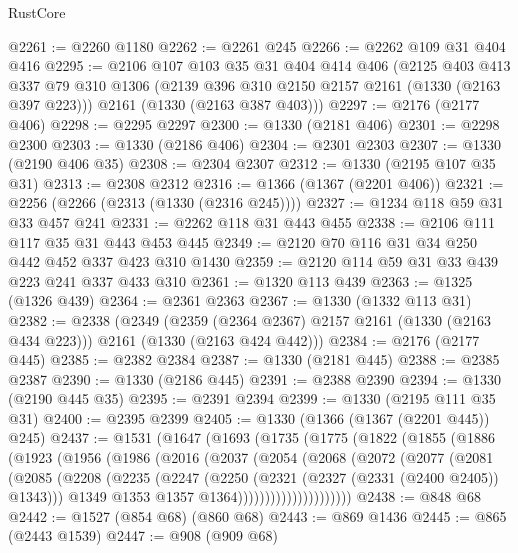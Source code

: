 \begin{lexlean}{RustCore}
\begin{coremodule}
{\begin{coremodule}
{{{{{{{{@2261 := @2260 @1180
@2262 := @2261 @245
@2266 := @2262 @109 @31 @404 @416
@2295 := @2106
    @107
    @103
    @35
    @31
    @404
    @414
    @406
    (@2125
      @403
      @413
      @337
      @79
      @310
      @1306
      (@2139 @396 @310 @2150 @2157 @2161 (@1330 (@2163 @397 @223)))
      @2161
      (@1330 (@2163 @387 @403)))
@2297 := @2176 (@2177 @406)
@2298 := @2295 @2297
@2300 := @1330 (@2181 @406)
@2301 := @2298 @2300
@2303 := @1330 (@2186 @406)
@2304 := @2301 @2303
@2307 := @1330 (@2190 @406 @35)
@2308 := @2304 @2307
@2312 := @1330 (@2195 @107 @35 @31)
@2313 := @2308 @2312
@2316 := @1366 (@1367 (@2201 @406))
@2321 := @2256 (@2266 (@2313 (@1330 (@2316 @245))))
@2327 := @1234 @118 @59 @31 @33 @457 @241
@2331 := @2262 @118 @31 @443 @455
@2338 := @2106 @111 @117 @35 @31 @443 @453 @445
@2349 := @2120 @70 @116 @31 @34 @250 @442 @452 @337 @423 @310 @1430
@2359 := @2120 @114 @59 @31 @33 @439 @223 @241 @337 @433 @310
@2361 := @1320 @113 @439
@2363 := @1325 (@1326 @439)
@2364 := @2361 @2363
@2367 := @1330 (@1332 @113 @31)
@2382 := @2338
    (@2349
      (@2359 (@2364 @2367) @2157 @2161 (@1330 (@2163 @434 @223)))
      @2161
      (@1330 (@2163 @424 @442)))
@2384 := @2176 (@2177 @445)
@2385 := @2382 @2384
@2387 := @1330 (@2181 @445)
@2388 := @2385 @2387
@2390 := @1330 (@2186 @445)
@2391 := @2388 @2390
@2394 := @1330 (@2190 @445 @35)
@2395 := @2391 @2394
@2399 := @1330 (@2195 @111 @35 @31)
@2400 := @2395 @2399
@2405 := @1330 (@1366 (@1367 (@2201 @445)) @245)
@2437 := @1531
    (@1647
      (@1693
        (@1735
          (@1775
            (@1822
              (@1855
                (@1886
                  (@1923
                    (@1956
                      (@1986
                        (@2016
                          (@2037
                            (@2054
                              (@2068
                                (@2072
                                  (@2077
                                    (@2081
                                      (@2085
                                        (@2208
                                          (@2235
                                            (@2247
                                              (@2250 (@2321 (@2327 (@2331 (@2400 @2405)) @1343)))
                                              @1349
                                              @1353
                                              @1357
                                              @1364)))))))))))))))))))))
@2438 := @848 @68
@2442 := @1527 (@854 @68) (@860 @68)
@2443 := @869 @1436
@2445 := @865 (@2443 @1539)
@2447 := @908 (@909 @68)
}}}}}}}}
\end{coremodule}}
\end{coremodule}
\end{lexlean}
